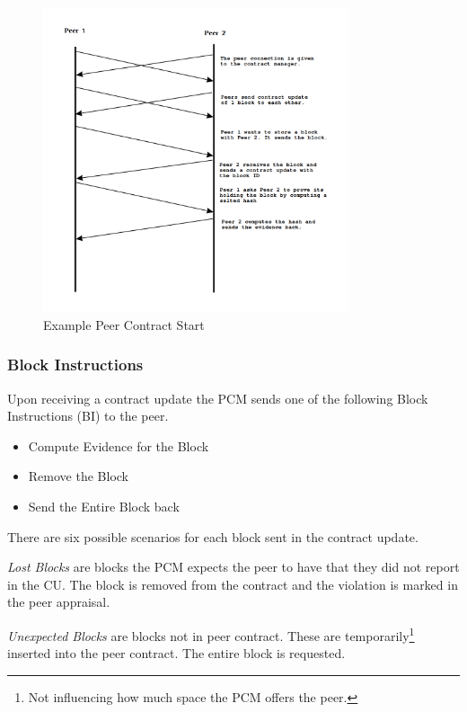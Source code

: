 \documentclass[11pt, a4paper, twoside]{report}
\begin{document}
\begin{figure}[h]
 \centering
 \includegraphics[width=0.8\textwidth]{contract-start}
 \caption{Example Peer Contract Start}
 \label{fig:contract-start}
\end{figure}

\subsubsection{Block Instructions}

Upon receiving a contract update the PCM sends one of the following Block Instructions (BI) to the peer.

\begin{itemize}
  \item Compute Evidence for the Block
  \item Remove the Block
  \item Send the Entire Block back
\end{itemize}

There are six possible scenarios for each block sent in the contract update.

\emph{Lost Blocks} are blocks the PCM expects the peer to have that they did not report in the CU. The block is removed from the contract and the violation is marked in the peer appraisal.

\emph{Unexpected Blocks} are blocks not in peer contract. These are temporarily\footnote{Not influencing how much space the PCM offers the peer.} inserted into the peer contract. The entire block is requested.
\end{document}
